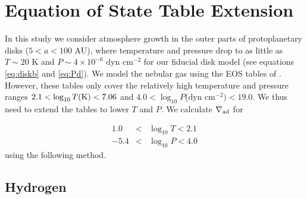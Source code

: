 \section{Equation of State Table Extension}\label{EOStables}

In this study we consider atmosphere growth in the outer parts of protoplanetary disks ($5<a<100$ AU), where temperature and pressure drop to as little as $T \sim 20$ K and $P \sim4\times10^{-6}$ dyn cm$^{-2}$ for our fiducial disk model (see equations \ref{eq:diskb} and \ref{eq:Pd}). We model the nebular gas using the EOS tables of \citet{saumon95}. However, these tables only cover the relatively high temperature and pressure ranges $2.1 < \log_{10} T(\rm{K})<7.06$ and $4.0<\log_{10}P$(dyn cm$^{-2})<19.0$. We thus need to extend the tables to lower $T$ and $P$. We calculate $\nabla_{\rm ad}$ for

\begin{eqnarray}
1.0 & < & \log_{10} T <2.1 \\ 
-5.4& < & \log_{10} P<4.0 
\end{eqnarray} 
using the following method.





\subsection{Hydrogen}

\label{hydrogen}

